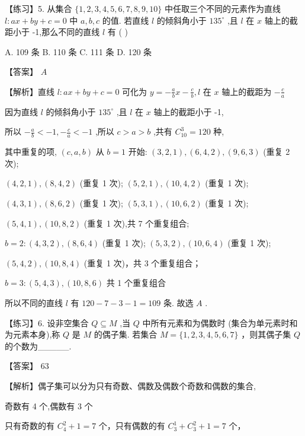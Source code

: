 \documentclass[10pt]{article}
\begin{document}
【练习】5. 从集合 \(\{ 1,2,3,4,5,6,7,8,9,{10}\}\) 中任取三个不同的元素作为直线 \(l : {ax} + {by} + c = 0\) 中 \(a,b,c\) 的值. 若直线 \(l\) 的倾斜角小于 \({135}^{ \circ  }\) ,且 \(l\) 在 \(x\) 轴上的截距小于 -1,那么不同的直线 \(l\) 有 ( )

A. 109 条 B. 110 条 C. 111 条 D. 120 条

【答案】 \(A\)

【解析】直线 \(l : {ax} + {by} + c = 0\) 可化为 \(y =  - \frac{a}{b}x - \frac{c}{b},l\) 在 \(x\) 轴上的截距为 \(- \frac{c}{a}\)

因为直线 \(l\) 的倾斜角小于 \({135}^{ \circ  }\) ,且 \(l\) 在 \(x\) 轴上的截距小于 -1,

所以 \(- \frac{a}{b} <  - 1, - \frac{c}{a} <  - 1\) ,所以 \(c > a > b\) ,共有 \({C}_{10}^{3} = {120}\) 种,

其中重复的项, \(\left( {c,a,b}\right)\) 从 \(b = 1\) 开始: \(\left( {3,2,1}\right) ,\left( {6,4,2}\right) ,\left( {9,6,3}\right)\) (重复 2 次);

\(\left( {4,2,1}\right) ,\left( {8,4,2}\right)\) (重复 1 次); \(\left( {5,2,1}\right) ,\left( {{10},4,2}\right)\) (重复 1 次);

\(\left( {4,3,1}\right) ,\left( {8,6,2}\right)\) (重复 1 次); \(\left( {5,3,1}\right) ,\left( {{10},6,2}\right)\) (重复 1 次);

\(\left( {5,4,1}\right) ,\left( {{10},8,2}\right)\) (重复 1 次),共 7 个重复组合;

\(b = 2 : \left( {4,3,2}\right) ,\left( {8,6,4}\right)\) (重复 1 次); \(\left( {5,3,2}\right) ,\left( {{10},6,4}\right)\) (重复 1 次);

\(\left( {5,4,2}\right) ,\left( {{10},8,4}\right)\) (重复 1 次)，共 3 个重复组合；

\(b = 3 : \left( {5,4,3}\right) ,\left( {{10},8,6}\right)\) 共 1 个重复组合

所以不同的直线 \(l\) 有 \({120} - 7 - 3 - 1 = {109}\) 条. 故选 \(A\) .

【练习】6. 设非空集合 \(Q \subseteq  M\) ,当 \(Q\) 中所有元素和为偶数时 (集合为单元素时和为元素本身),称 \(Q\) 是 \(M\) 的偶子集. 若集合 \(M = \{ 1,2,3,4,5,6,7\}\) ，则其偶子集 \(Q\) 的个数为\_\_\_\_\_.

【答案】 63

【解析】偶子集可以分为只有奇数、偶数及偶数个奇数和偶数的集合,

奇数有 4 个,偶数有 3 个

只有奇数的有 \({C}_{4}^{2} + 1 = 7\) 个，只有偶数的有 \({C}_{3}^{1} + {C}_{3}^{2} + 1 = 7\) 个，
\end{document}
